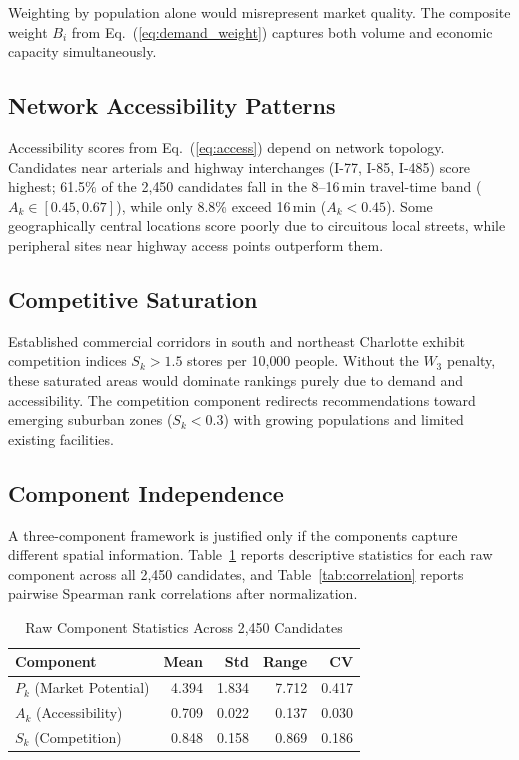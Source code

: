 \documentclass[conference]{IEEEtran}
\begin{document}
Weighting by population alone would misrepresent market quality.  The
composite weight $B_i$ from Eq.~(\ref{eq:demand_weight}) captures both
volume and economic capacity simultaneously.

\subsection{Network Accessibility Patterns}

Accessibility scores from Eq.~(\ref{eq:access}) depend on network
topology.  Candidates near arterials and highway interchanges
(I-77, I-85, I-485) score highest; 61.5\% of the 2{,}450 candidates
fall in the 8--16\,min travel-time band ($A_k \in [0.45, 0.67]$),
while only 8.8\% exceed 16\,min ($A_k < 0.45$).  Some geographically
central locations score poorly due to circuitous local streets, while
peripheral sites near highway access points outperform them.

\subsection{Competitive Saturation}

Established commercial corridors in south and northeast Charlotte
exhibit competition indices $S_k > 1.5$ stores per 10{,}000 people.
Without the $W_3$ penalty, these saturated areas would dominate
rankings purely due to demand and accessibility.  The competition
component redirects recommendations toward emerging suburban zones
($S_k < 0.3$) with growing populations and limited existing facilities.

\subsection{Component Independence}
\label{sec:component_analysis}

A three-component framework is justified only if the components capture
different spatial information.  Table~\ref{tab:component_stats} reports
descriptive statistics for each raw component across all 2{,}450
candidates, and Table~\ref{tab:correlation} reports pairwise Spearman
rank correlations after normalization.

\begin{table}[!t]
\centering
\caption{Raw Component Statistics Across 2,450 Candidates}
\label{tab:component_stats}
\begin{tabular}{lrrrr}
\toprule
\textbf{Component} & \textbf{Mean} & \textbf{Std} & \textbf{Range}
                    & \textbf{CV} \\
\midrule
$P_k$ (Market Potential) & 4.394 & 1.834 & 7.712 & 0.417 \\
$A_k$ (Accessibility)    & 0.709 & 0.022 & 0.137 & 0.030 \\
$S_k$ (Competition)      & 0.848 & 0.158 & 0.869 & 0.186 \\
\bottomrule
\end{tabular}
\end{table}
\end{document}
